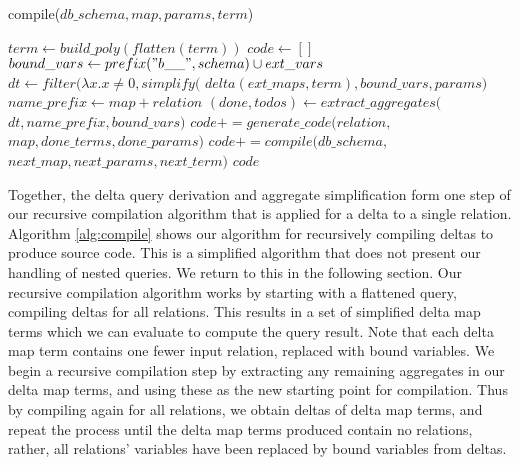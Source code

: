 \newcommand{\indentcode}{\hspace{5mm}}
\begin{algorithm}
\caption{compile($db\_schema, map, params, term$)}
\label{alg:compile}
\begin{algorithmic}[1]
  \STATE {}
  \STATE $term \leftarrow build\_poly(flatten(term))$
\ENDIF
\STATE $code \leftarrow []$
  \STATE {}
  \STATE $bound\_vars \leftarrow prefix("b\_\_", schema) \cup ext\_vars$
  \STATE $dt \leftarrow filter(\lambda x. x \neq 0, simplify($
    \STATE \indentcode $delta(ext\_maps,term),bound\_vars, params)$
  \STATE $name\_prefix \leftarrow map+relation$
  \STATE $(done, todos) \leftarrow extract\_aggregates($
    \STATE \indentcode $dt, name\_prefix, bound\_vars)$
     \STATE $code += generate\_code(relation,$
     \STATE \indentcode $map, done\_terms, done\_params)$
  \ENDFOR
  \STATE {}
  \STATE $code += compile(db\_schema, $
  \STATE \indentcode $next\_map, next\_params, next\_term)$
  \ENDFOR
\ENDFOR
\RETURN $code$
\end{algorithmic}
\end{algorithm}


Together, the delta query derivation and aggregate simplification form one step
of our recursive compilation algorithm that is applied for a delta to a single
relation. 
Algorithm \ref{alg:compile} shows our algorithm for recursively compiling deltas
to produce source code. This is a simplified algorithm that does not present our
handling of nested queries. We return to this in the following section.  Our
recursive compilation algorithm works by starting with a flattened query,
compiling deltas for all relations. This results in a set of simplified delta
map terms which we can evaluate to compute the query result. Note that each
delta map term contains one fewer input relation, replaced with bound
variables. We begin a recursive compilation step by extracting any remaining
aggregates in our delta map terms, and using these as the new starting point for
compilation. Thus by compiling again for all relations, we obtain deltas of
delta map terms, and repeat the process until the delta map terms produced
contain no relations, rather, all relations' variables have been replaced by
bound variables from deltas.


